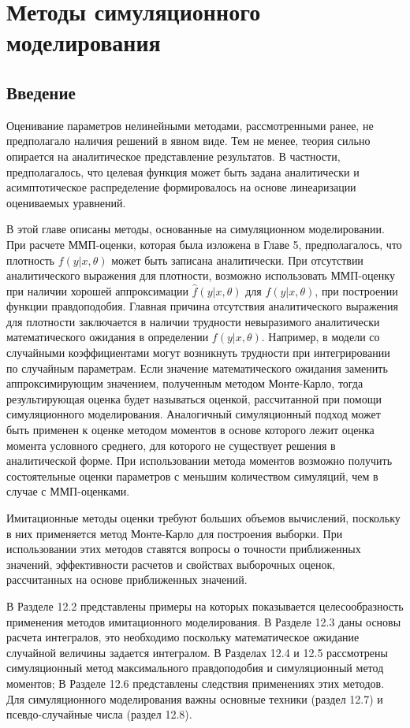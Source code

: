 
\chapter {Методы симуляционного моделирования}


\section{Введение}
Оценивание параметров нелинейными методами, рассмотренными ранее, не предполагало  наличия решений в явном виде. Тем не менее, теория сильно опирается на аналитическое представление результатов. В частности, предполагалось, что целевая функция может быть задана аналитически и асимптотическое распределение формировалось на основе линеаризации оцениваемых уравнений. 

В этой главе описаны методы, основанные на симуляционном моделировании. При расчете ММП-оценки, которая была изложена в Главе 5, предполагалось, что плотность $f(y|x,\theta)$ может быть записана аналитически. При отсутствии аналитического выражения для плотности, возможно использовать ММП-оценку при наличии хорошей аппроксимации $\hat{f}(y|x,\theta)$ для $f(y|x,\theta)$, при построении функции правдоподобия.
Главная причина отсутствия аналитического выражения для плотности заключается в наличии трудности невыразимого аналитически  математического ожидания  в определении  $f(y|x,\theta)$. Например, в модели со случайными коэффициентами могут возникнуть трудности при интегрировании по случайным параметрам. Если значение математического ожидания заменить аппроксимирующим значением, полученным методом Монте-Карло, тогда результирующая оценка будет называться оценкой, рассчитанной при помощи симуляционного моделирования. Аналогичный симуляционный подход может быть применен к оценке методом моментов в основе которого лежит оценка момента условного среднего, для которого не существует решения в аналитической форме. При использовании метода моментов возможно получить состоятельные оценки параметров с меньшим количеством симуляций, чем в случае с ММП-оценками. 

Имитационные методы оценки требуют больших объемов вычислений, поскольку в них применяется метод Монте-Карло для построения выборки. При использовании этих методов ставятся вопросы о точности приближенных значений, эффективности расчетов и свойствах выборочных оценок, рассчитанных на основе приближенных значений.

В Разделе 12.2 представлены примеры на которых показывается целесообразность применения методов имитационного моделирования. В Разделе 12.3 даны основы расчета интегралов, это необходимо поскольку математическое ожидание случайной величины задается интегралом. В Разделах 12.4 и 12.5 рассмотрены симуляционный метод максимального правдоподобия и симуляционный метод моментов; В Разделе 12.6 представлены следствия применениях этих методов. Для симуляционного моделирования важны основные техники (раздел 12.7) и псевдо-случайные числа (раздел 12.8).

